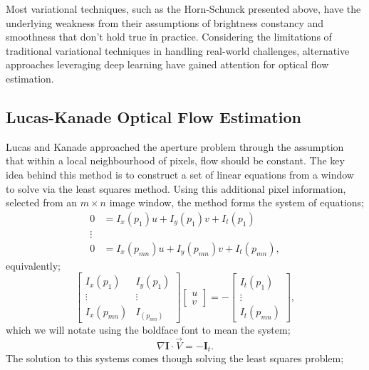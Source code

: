 \IEEEPARstart{} Most variational techniques, such as the Horn-Schunck presented above, have the underlying weakness from their assumptions of brightness constancy and smoothness that don't hold true in practice. Considering the limitations of traditional variational techniques in handling real-world challenges, alternative approaches leveraging deep learning have gained attention for optical flow estimation.

\subsection{Lucas-Kanade Optical Flow Estimation}

\IEEEPARstart{}{} Lucas and Kanade approached the aperture problem through the assumption that within a local neighbourhood of pixels, flow should be constant. The key idea behind this method is to construct a set of linear equations from a window to solve via the least squares method. Using this additional pixel information, selected from an $m \times n$ image window, the method forms the system of equations;
\begin{align*}
    0 &= I_x(p_1) u + I_y(p_1) v + I_t(p_1) \\
    \vdots & \\
    0 &= I_x(p_{m n}) u + I_y(p_{m n}) v + I_t(p_{m n}),
\end{align*}
equivalently;
\begin{equation*}
    \begin{bmatrix}
        I_x(p_1) & I_y(p_1) \\
        \vdots & \vdots \\
        I_x(p_{m n}) & I_(p_{m n}) 
    \end{bmatrix}
    \begin{bmatrix}
        u \\
        v
    \end{bmatrix}
    = 
    - \begin{bmatrix}
        I_t(p_1) \\
        \vdots \\
        I_t(p_{m n})
    \end{bmatrix},
\end{equation*}
which we will notate using the boldface font to mean the system;
\begin{equation}
	\nabla \mathbf{I} \cdot \vec{V} = - \mathbf{I}_t.
\end{equation}
The solution to this systems comes though solving the least squares problem;
